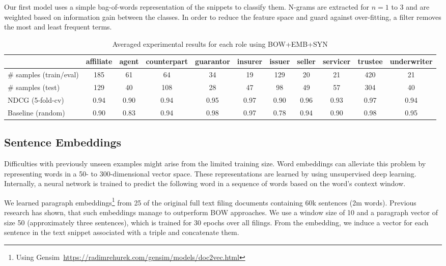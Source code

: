 Our first model uses a simple bag-of-words representation of the snippets to classify them.
N-grams are extracted for $n=1$ to $3$ and are weighted based on information gain between the classes.
In order to reduce the feature space and guard against over-fitting, a filter removes the most and least frequent terms.

\begin{table}[tb]
	\caption{Averaged experimental results for each role using BOW+EMB+SYN}
	\label{tab:roleresults}
	\begin{tabular}{lcccccccccc}
		\toprule
		& affiliate & agent & counterpart & guarantor & insurer & issuer & seller & servicer & trustee & underwriter \\
		\midrule %
               \# samples (train/eval) & 185  & 61   & 64   & 34   & 19   & 129  & 20   & 21   & 420  & 21   \\
               \# samples (test)       & 129  & 40   & 108  & 28   & 47   & 98   & 49   & 57   & 304  & 40   \\
               NDCG (5-fold-cv)        & 0.94 & 0.90 & 0.94 & 0.95 & 0.97 & 0.90 & 0.96  & 0.93 & 0.97 & 0.94  \\
               Baseline (random)       & 0.90 & 0.83 & 0.94 & 0.98 & 0.97 & 0.78 & 0.94 & 0.90 & 0.98 & 0.95 \\
		\bottomrule
	\end{tabular}
\end{table}

\subsection{Sentence Embeddings}
Difficulties with previously unseen examples might arise from the limited training size.
Word embeddings can alleviate this problem by representing words in a 50- to 300-dimensional vector space.
These representations are learned by using unsupervised deep learning.
Internally, a neural network is trained to predict the following word in a sequence of words based on the word's context window. 

We learned paragraph embeddings\footnote{Using Gensim~\url{https://radimrehurek.com/gensim/models/doc2vec.html}} from 25 of the original full text filing documents containing 60k sentences (2m words).
Previous research has shown, that such embeddings manage to outperform BOW approaches\cite{embeddings}. 
We use a window size of 10 and a paragraph vector of size 50 (approximately three sentences), which is trained for 30 epochs over all filings.
From the embedding, we induce a vector for each sentence in the text snippet associated with a triple and concatenate them.

